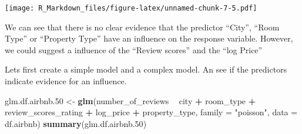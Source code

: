\documentclass[
]{article}
\newenvironment{Shaded}{\begin{snugshade}}{\end{snugshade}}
\newcommand{\DataTypeTok}[1]{\textcolor[rgb]{0.13,0.29,0.53}{#1}}
\newcommand{\FloatTok}[1]{\textcolor[rgb]{0.00,0.00,0.81}{#1}}
\newcommand{\KeywordTok}[1]{\textcolor[rgb]{0.13,0.29,0.53}{\textbf{#1}}}
\newcommand{\NormalTok}[1]{#1}
\newcommand{\OperatorTok}[1]{\textcolor[rgb]{0.81,0.36,0.00}{\textbf{#1}}}
\newcommand{\StringTok}[1]{\textcolor[rgb]{0.31,0.60,0.02}{#1}}
\begin{document}
\texttt{[image: R\_Markdown\_files/figure-latex/unnamed-chunk-7-5.pdf]}

We can see that there is no clear evidence that the predictor ``City'',
``Room Type'' or ``Property Type'' have an influence on the response
variable. However, we could suggest a influence of the ``Review scores''
and the ``log Price''

Lets first create a simple model and a complex model. An see if the
predictors indicate evidence for an influence.

\begin{Shaded}
\begin{Highlighting}[]
\NormalTok{glm.df.airbnb}\FloatTok{.50}\NormalTok{ <-}\StringTok{ }\KeywordTok{glm}\NormalTok{(number_of_reviews }\OperatorTok{~}\StringTok{ }\NormalTok{city }\OperatorTok{+}\StringTok{ }\NormalTok{room_type }\OperatorTok{+}\StringTok{ }
\StringTok{                          }\NormalTok{review_scores_rating }\OperatorTok{+}\StringTok{ }\NormalTok{log_price }\OperatorTok{+}\StringTok{ }\NormalTok{property_type,}
                        \DataTypeTok{family =} \StringTok{"poisson"}\NormalTok{,}
                        \DataTypeTok{data =}\NormalTok{ df.airbnb)}
\KeywordTok{summary}\NormalTok{(glm.df.airbnb}\FloatTok{.50}\NormalTok{)}
\end{Highlighting}
\end{Shaded}
\end{document}
